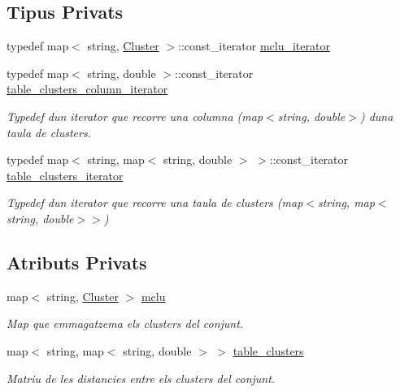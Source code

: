 \subsection*{Tipus Privats}
\begin{DoxyCompactItemize}
\item 
typedef map$<$ string, \hyperlink{class_cluster}{Cluster} $>$\+::const\+\_\+iterator \hyperlink{class_cjt___clusters_ad9cf46a8e1e6430c7b34b184f2756054}{mclu\+\_\+iterator}
\item 
typedef map$<$ string, double $>$\+::const\+\_\+iterator \hyperlink{class_cjt___clusters_abdef6142bd4683a878bb393a9095555e}{table\+\_\+clusters\+\_\+column\+\_\+iterator}
\begin{DoxyCompactList}\small\item\em Typedef d\textquotesingle{}un iterator que recorre una columna (map$<$string, double$>$) d\textquotesingle{}una taula de clusters. \end{DoxyCompactList}\item 
typedef map$<$ string, map$<$ string, double $>$ $>$\+::const\+\_\+iterator \hyperlink{class_cjt___clusters_ac53ace59de6ecf75f90d7a4fc6e56c0e}{table\+\_\+clusters\+\_\+iterator}
\begin{DoxyCompactList}\small\item\em Typedef d\textquotesingle{}un iterator que recorre una taula de clusters (map$<$string, map$<$string, double$>$$>$) \end{DoxyCompactList}\end{DoxyCompactItemize}
\subsection*{Atributs Privats}
\begin{DoxyCompactItemize}
\item 
map$<$ string, \hyperlink{class_cluster}{Cluster} $>$ \hyperlink{class_cjt___clusters_a5f5e13255bca1fac2ad65c51473f6ead}{mclu}
\begin{DoxyCompactList}\small\item\em Map que emmagatzema els clusters del conjunt. \end{DoxyCompactList}\item 
map$<$ string, map$<$ string, double $>$ $>$ \hyperlink{class_cjt___clusters_a6af3fcf70683cdb88f137f6f51002939}{table\+\_\+clusters}
\begin{DoxyCompactList}\small\item\em Matriu de les distancies entre els clusters del conjunt. \end{DoxyCompactList}\end{DoxyCompactItemize}


